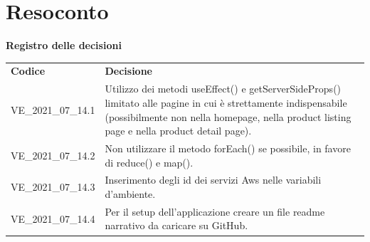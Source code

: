 \documentclass[a4paper]{article}
\begin{document}
\section{Resoconto}
\begin{center}
    \textbf{\Large Registro delle decisioni}\\
    \vspace{10px}
    \begin{table}[h!]
        \centering
        \renewcommand{\arraystretch}{1.8}
        \begin{tabular}{p{200px} p{200px}}
            \rowcolor{logo!70} \textbf{Codice} & \textbf{Decisione}                                                                                                                                                                                           \\
            VE\_2021\_07\_14.1                 & Utilizzo dei metodi useEffect() e getServerSideProps() limitato alle pagine in cui è strettamente indispensabile (possibilmente non nella homepage, nella product listing page e nella product detail page). \\
            VE\_2021\_07\_14.2                 & Non utilizzare il metodo forEach() se possibile, in favore di reduce() e map().                                                                                                                              \\
            VE\_2021\_07\_14.3                 & Inserimento degli id dei servizi Aws nelle variabili d'ambiente.                                                                                                                                             \\
            VE\_2021\_07\_14.4                 & Per il setup dell'applicazione creare un file readme narrativo da caricare su GitHub.                                                                                                                        \\
        \end{tabular}
    \end{table}
\end{center}
\end{document}

